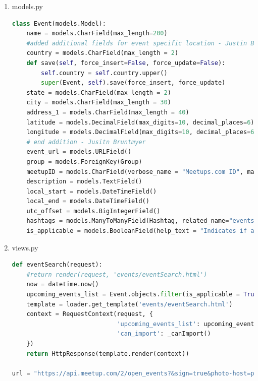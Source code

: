 \documentclass[letterpaper,10pt,onecolumn]{IEEEtran} %
\begin{document}
\begin{enumerate}
\item models.py
\begin{center}
\begin{lstlisting}[language=Python]
class Event(models.Model):
    name = models.CharField(max_length=200)
    #added additional fields for event specific location - Justin Bruntmyer
    country = models.CharField(max_length = 2)
    def save(self, force_insert=False, force_update=False):
        self.country = self.country.upper()
        super(Event, self).save(force_insert, force_update)
    state = models.CharField(max_length = 2)
    city = models.CharField(max_length = 30)
    address_1 = models.CharField(max_length = 40)
    latitude = models.DecimalField(max_digits=10, decimal_places=6)
    longitude = models.DecimalField(max_digits=10, decimal_places=6)
    # end addition - Jusitn Bruntmyer
    event_url = models.URLField()
    group = models.ForeignKey(Group)
    meetupID = models.CharField(verbose_name = "Meetups.com ID", max_length=50, unique=True)
    description = models.TextField()
    local_start = models.DateTimeField()
    local_end = models.DateTimeField()
    utc_offset = models.BigIntegerField()
    hashtags = models.ManyToManyField(Hashtag, related_name="events")
    is_applicable = models.BooleanField(help_text = "Indicates if an event is applicable to our audience or not.", default=True)

\end{lstlisting}
\end{center}

\item views.py
\begin{center}
\begin{lstlisting}[language=Python]
def eventSearch(request):
    #return render(request, 'events/eventSearch.html')
    now = datetime.now()
    upcoming_events_list = Event.objects.filter(is_applicable = True).filter(local_start__gte=now).order_by('local_start')
    template = loader.get_template('events/eventSearch.html')
    context = RequestContext(request, {
                             'upcoming_events_list': upcoming_events_list,
                             'can_import': _canImport()
    })
    return HttpResponse(template.render(context))
    
url = "https://api.meetup.com/2/open_events?&sign=true&photo-host=public&state=ky&city=lexington&country=usa&topic=" + hashtag.name + "&radius=10000&sign=true&key=" + MEETUP_API_KEY


\end{lstlisting}
\end{center}
\end{enumerate}
\end{document}
